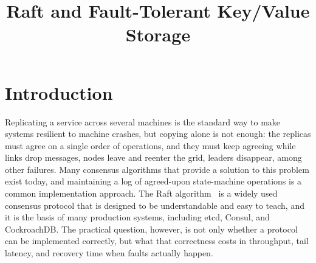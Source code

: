 \documentclass[conference]{IEEEtran}
\newcommand{\todo}[1]{\textcolor{red}{\textbf{[TODO:} #1\textbf{]}}}
\begin{document}
\title{Raft and Fault-Tolerant Key/Value Storage}

\author{
\and
{}
}

\maketitle




\section{Introduction}
Replicating a service across several machines is the standard way to make systems resilient to machine crashes, but copying alone is not enough: the replicas must agree on a single order of operations, and they must keep agreeing while links drop messages, nodes leave and reenter the grid, leaders disappear, among other failures. Many consensus algorithms that provide a solution to this problem exist today, and maintaining a log of agreed-upon state-machine operations is a common implementation approach. The Raft algorithm~\cite{raft2014} is a widely used consensus protocol that is designed to be understandable and easy to teach, and it is the basis of many production systems, including etcd, Consul, and CockroachDB. The practical question, however, is not only whether a protocol can be implemented correctly, but what that correctness costs in throughput, tail latency, and recovery time when faults actually happen.
\end{document}
